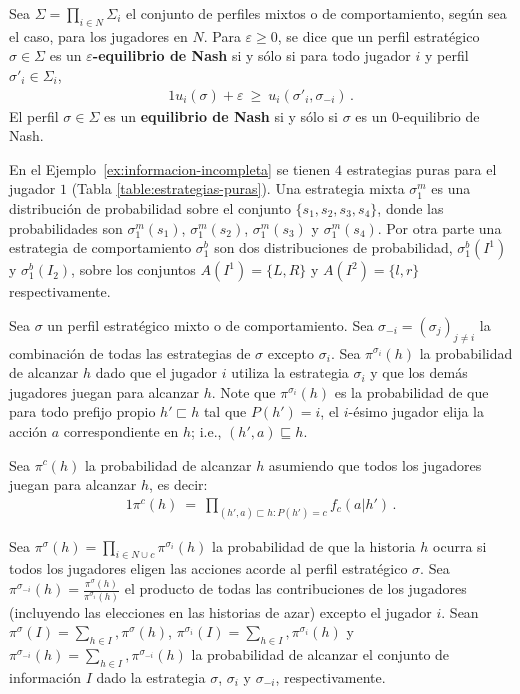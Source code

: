 \begin{definition}
Sea $\Sigma=\prod_{i\in N}\Sigma_i$ el conjunto de perfiles mixtos o de comportamiento, según sea el caso, para los jugadores en $N$.
Para $\varepsilon\geq 0$, se dice que un perfil estratégico $\sigma \in \Sigma$ es un \textbf{$\varepsilon$-equilibrio de Nash} si y sólo si para todo jugador $i$ y perfil $\sigma'_i\in\Sigma_i$,
\begin{alignat}{1}
u_i(\sigma) + \varepsilon\ \geq\ u_i(\sigma'_i, \sigma_{-i}) \,.
\end{alignat}
El perfil $\sigma\in\Sigma$ es un \textbf{equilibrio de Nash} si y sólo si $\sigma$ es un $0$-equilibrio de Nash.
\end{definition}

En el Ejemplo~\ref{ex:informacion-incompleta} se tienen $4$ estrategias puras para el jugador $1$ (Tabla \ref{table:estrategias-puras}). Una estrategia mixta $\sigma^m_1$ es una distribución de probabilidad sobre el conjunto $\{s_1, s_2, s_3, s_4\}$, donde las probabilidades son $\sigma^m_1(s_1)$, $\sigma^m_1(s_2)$, $\sigma^m_1(s_3)$ y $\sigma^m_1(s_4)$. Por otra parte una estrategia de comportamiento $\sigma^b_1$ son dos distribuciones de probabilidad, $\sigma^b_1(I^1)$ y $\sigma^b_1(I_2)$, sobre los conjuntos $A(I^1) = \{L, R\}$ y $A(I^2) = \{l, r\}$ respectivamente.

Sea $\sigma$ un perfil estratégico mixto o de comportamiento. Sea  $\sigma_{-i} = (\sigma_j)_{j \neq i}$ la combinación de todas las estrategias de $\sigma$ excepto $\sigma_i$. Sea $\pi^{\sigma_i}(h)$ la probabilidad de alcanzar $h$ dado que el jugador $i$ utiliza la estrategia $\sigma_i$ y que los demás jugadores juegan para alcanzar $h$. Note que $\pi^{\sigma_i}(h)$ es la probabilidad de que para todo prefijo propio $h' \sqsubset h$ tal que $P(h') = i$, el $i$-ésimo jugador elija la acción $a$ correspondiente en $h$; i.e., $(h', a) \sqsubseteq h$.

Sea $\pi^c(h)$ la probabilidad de alcanzar $h$ asumiendo que todos los jugadores juegan para alcanzar $h$, es decir:
\begin{alignat}{1}
\pi^c(h)\ =\ \prod_{(h', a) \sqsubset h : P(h') = c} f_c(a | h') \, .
\end{alignat}

Sea $\pi^{\sigma}(h) = \prod_{i \in N \cup {c}} \pi^{\sigma_i}(h)$ la probabilidad de que la historia $h$ ocurra si todos los jugadores eligen las acciones acorde al perfil estratégico  $\sigma$.  Sea $\pi^{\sigma_{-i}}(h) = \frac{\pi^{\sigma}(h)}{\pi^{\sigma_{i}}(h)}$ el producto de todas las contribuciones de los jugadores (incluyendo las elecciones en las historias de azar) excepto el jugador $i$. Sean $\pi^{\sigma}(I) = \sum_{h \in I},  \pi^\sigma(h)$, $\pi^{\sigma_i}(I) = \sum_{h \in I},  \pi^{\sigma_i}(h)$ y $\pi^{\sigma_{-i}}(h) = \sum_{h \in I},  \pi^{\sigma_{-i}}(h)$ la probabilidad de alcanzar el conjunto de información $I$ dado la estrategia $\sigma$, $\sigma_{i}$ y $\sigma_{-i}$, respectivamente.

